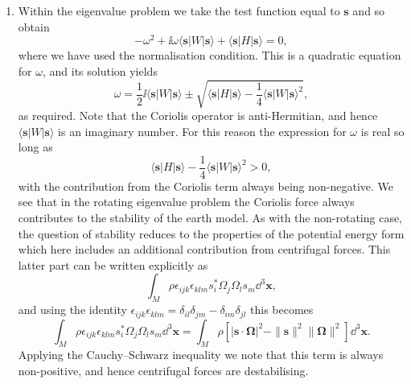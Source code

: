 \documentclass[a4paper,10pt]{paper}
\begin{document}
\begin{enumerate}
\item Within the eigenvalue problem we take the test function equal to $\mathbf{s}$ and so obtain
\begin{equation*}
    -\omega^{2}+\ii\omega\langle \mathbf{s}|W|\mathbf{s}\rangle+\langle \mathbf{s}|H|\mathbf{s}\rangle=0,
\end{equation*}
where we have used the normalisation condition. This is a quadratic equation for $\omega$, and its solution yields
\begin{equation*}
    \omega=\frac{1}{2}\ii\langle \mathbf{s}|W|\mathbf{s}\rangle\pm\sqrt{\langle \mathbf{s}|H|\mathbf{s}\rangle-\frac{1}{4}\langle \mathbf{s}|W|\mathbf{s}\rangle^{2}},
\end{equation*}
as required. Note that the Coriolis operator is anti-Hermitian, and hence $\langle \mathbf{s}|W|\mathbf{s}\rangle$ is an imaginary number. For this reason the expression for $\omega$ is real so long as
\begin{equation*}
    \langle \mathbf{s}|H|\mathbf{s}\rangle-\frac{1}{4}\langle \mathbf{s}|W|\mathbf{s}\rangle^{2}>0,
\end{equation*}
with the contribution from the Coriolis term always being non-negative. We see that in the rotating eigenvalue problem the Coriolis force always contributes to the stability of the earth model. As with the non-rotating case, the question of stability reduces to the properties of the potential energy form which here includes an additional contribution from centrifugal forces. This latter part can be written explicitly as
\begin{equation*}
    \int_{M}\rho\epsilon_{ijk}\epsilon_{klm}s_{i}^{*}\Omega_{j}\Omega_{l}s_{m}\dd^{3}\mathbf{x},
\end{equation*}
and using the identity $\epsilon_{ijk}\epsilon_{klm}=\delta_{il}\delta_{jm}-\delta_{im}\delta_{jl}$ this becomes
\begin{equation*}
    \int_{M}\rho\epsilon_{ijk}\epsilon_{klm}s_{i}^{*}\Omega_{j}\Omega_{l}s_{m}\dd^{3}\mathbf{x}=\int_{M}\rho[|\mathbf{s}\cdot\bm{\Omega}|^{2}-\|\mathbf{s}\|^{2}\|\bm{\Omega}\|^{2}]\dd^{3}\mathbf{x}.
\end{equation*}
Applying the Cauchy--Schwarz inequality we note that this term is always non-positive, and hence centrifugal forces are destabilising.


\end{enumerate}
\end{document}
